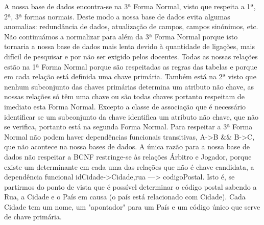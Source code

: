 \documentclass[a4paper]{article}
\begin{document}
A nossa base de dados encontra-se na 3ª Forma Normal, visto que respeita a 1ª, 2ª, 3ª formas normais. Deste modo a nossa base de dados evita algumas anomalias: redundância de dados, atualização de campos, campos sinónimos, etc. Não continuámos a normalizar para além da 3ª Forma Normal porque isto tornaria a nossa base de dados mais lenta devido à quantidade de ligações, mais difícil de pesquisar e por não ser exigido pelos docentes. Todas as nossas relações estão na 1ª Forma Normal porque são respeitadas as regras das tabelas e porque em cada relação está definida uma chave primária. Também está na 2ª visto que nenhum subconjunto das chaves primárias determina um atributo não chave, as nossas relações só têm uma chave ou são todas chaves portanto respeitam de imediato esta Forma Normal. Excepto a classe de associação que é necessário identificar se um subconjunto da chave identifica um atributo não chave, que não se verifica, portanto está na segunda Forma Normal. Para respeitar a 3ª Forma Normal não podem haver dependências funcionais transitivas, A->B \&\& B->C, que não acontece na nossa bases de dados. A única razão para a nossa base de dados não respeitar a BCNF restringe-se às relações Árbitro e Jogador, porque existe um determinante em cada uma das relações que não é chave candidata, a dependência funcional idCidade->Cidade,rua ---> codigoPostal. Isto é, se partirmos do ponto de vista que é possível determinar o código postal sabendo a Rua, a Cidade e o País em causa (o país está relacionado com Cidade). Cada Cidade tem um nome, um "apontador" para um País e um código único que serve de chave primária.

\end{document}
